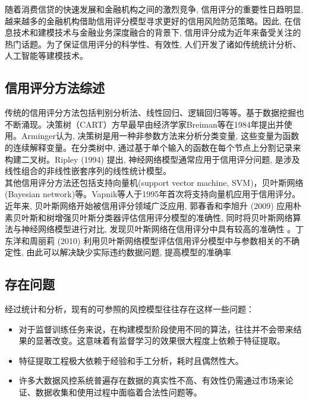 
随着消费信贷的快速发展和金融机构之间的激烈竞争, 信用评分的重要性日趋明显, 越来越多的金融机构借助信用评分模型寻求更好的信用风险防范策略。因此, 在信息技术和建模技术与金融业务深度融合的背景下, 信用评分成为近年来备受关注的热门话题。为了保证信用评分的科学性、有效性, 人们开发了诸如传统统计分析、人工智能等建模技术。
\subsection{信用评分方法综述}
传统的信用评分方法包括判别分析法、线性回归、逻辑回归等等。基于数据挖掘也不断涌现。决策树（CART）方早最早由经济学家Breiman等在1984年提出并使用。Arminger认为, 决策树是用一种非参数方法来分析分类变量, 这些变量为函数的连续解释变量。在分类树中, 通过基于单个输入的函数在每个节点上分割记录来构建二叉树。Ripley (1994)\cite{ref1} 提出, 神经网络模型通常应用于信用评分问题, 是涉及线性组合的非线性嵌套序列的线性统计模型。\\

其他信用评分方法还包括支持向量机(support vector machine, SVM)，贝叶斯网络 (Bayesian network)等。Vapnik等人于1995年首次将支持向量机应用于信用评分。近年来, 贝叶斯网络开始被信用评分领域广泛应用, 郭春香和李旭升 (2009) 应用朴素贝叶斯和树增强贝叶斯分类器评估信用评分模型的准确性, 同时将贝叶斯网络算法与神经网络模型进行对比, 发现贝叶斯网络在信用评分中具有较高的准确性\cite{ref2} 。丁东洋和周丽莉 (2010) 利用贝叶斯网络模型评估信用评分模型中与参数相关的不确定性, 由此可以解决缺少实际违约数据问题, 提高模型的准确率\cite{ref3} \\

\subsection{存在问题}
经过统计和分析，现有的可参照的风控模型往往存在这样一些问题：
\begin{itemize}
	\item 对于监督训练任务来说，在构建模型阶段使用不同的算法，往往并不会带来结果的显著改变。这意味着有监督学习的效果很大程度上依赖于特征提取。
	\item 特征提取工程极大依赖于经验和手工分析，耗时且偶然性大。
	\item 许多大数据风控系统普遍存在数据的真实性不高、有效性仍需通过市场来论证、数据收集和使用过程中面临着合法性问题等。
\end{itemize}



